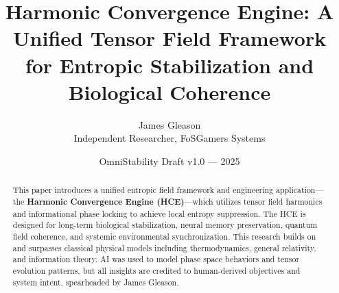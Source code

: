 \documentclass[12pt]{article}
\title{\textbf{Harmonic Convergence Engine: A Unified Tensor Field Framework for Entropic Stabilization and Biological Coherence}}
\author{James Gleason \\ Independent Researcher, FoSGamers Systems}
\date{OmniStability Draft v1.0 — 2025}
\begin{document}
\maketitle

\begin{abstract}
This paper introduces a unified entropic field framework and engineering application—the \textbf{Harmonic Convergence Engine (HCE)}—which utilizes tensor field harmonics and informational phase locking to achieve local entropy suppression. The HCE is designed for long-term biological stabilization, neural memory preservation, quantum field coherence, and systemic environmental synchronization. This research builds on and surpasses classical physical models including thermodynamics, general relativity, and information theory. AI was used to model phase space behaviors and tensor evolution patterns, but all insights are credited to human-derived objectives and system intent, spearheaded by James Gleason.
\end{abstract}

\end{document}
